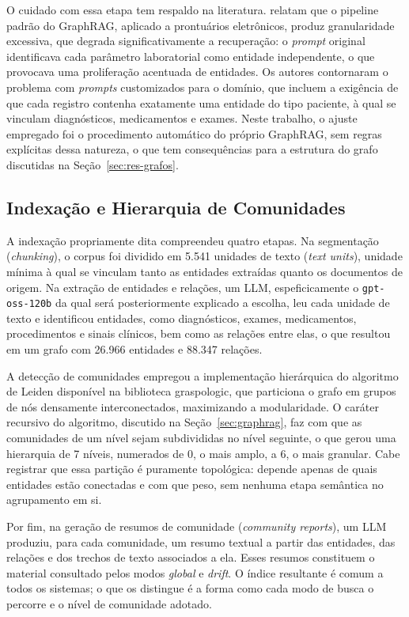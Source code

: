 O cuidado com essa etapa tem respaldo na literatura. \citet{ye2026} relatam que o pipeline padrão do GraphRAG, aplicado a prontuários eletrônicos, produz granularidade excessiva, que degrada significativamente a recuperação: o \textit{prompt} original identificava cada parâmetro laboratorial como entidade independente, o que provocava uma proliferação acentuada de entidades. Os autores contornaram o problema com \textit{prompts} customizados para o domínio, que incluem a exigência de que cada registro contenha exatamente uma entidade do tipo paciente, à qual se vinculam diagnósticos, medicamentos e exames. Neste trabalho, o ajuste empregado foi o procedimento automático do próprio GraphRAG, sem regras explícitas dessa natureza, o que tem consequências para a estrutura do grafo discutidas na Seção~\ref{sec:res-grafos}.

\subsection{Indexação e Hierarquia de Comunidades}\label{sec:met-hierarquia}

A indexação propriamente dita compreendeu quatro etapas. Na segmentação (\textit{chunking}), o corpus foi dividido em 5.541 unidades de texto (\textit{text units}), unidade mínima à qual se vinculam tanto as entidades extraídas quanto os documentos de origem. Na extração de entidades e relações, um LLM, espeficicamente o \texttt{gpt-oss-120b} da qual será posteriormente explicado a escolha, leu cada unidade de texto e identificou entidades, como diagnósticos, exames, medicamentos, procedimentos e sinais clínicos, bem como as relações entre elas, o que resultou em um grafo com 26.966 entidades e 88.347 relações.

A detecção de comunidades empregou a implementação hierárquica do algoritmo de Leiden \citep{traag2019} disponível na biblioteca graspologic, que particiona o grafo em grupos de nós densamente interconectados, maximizando a modularidade. O caráter recursivo do algoritmo, discutido na Seção~\ref{sec:graphrag}, faz com que as comunidades de um nível sejam subdivididas no nível seguinte, o que gerou uma hierarquia de 7 níveis, numerados de 0, o mais amplo, a 6, o mais granular. Cabe registrar que essa partição é puramente topológica: depende apenas de quais entidades estão conectadas e com que peso, sem nenhuma etapa semântica no agrupamento em si.

Por fim, na geração de resumos de comunidade (\textit{community reports}), um LLM produziu, para cada comunidade, um resumo textual a partir das entidades, das relações e dos trechos de texto associados a ela. Esses resumos constituem o material consultado pelos modos \textit{global} e \textit{drift}. O índice resultante é comum a todos os sistemas; o que os distingue é a forma como cada modo de busca o percorre e o nível de comunidade adotado.

